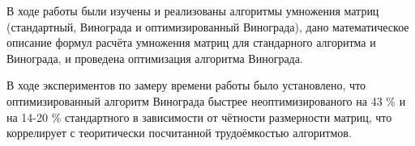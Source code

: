 \Conclusion
    В ходе работы были изучены и реализованы алгоритмы умножения матриц
    (стандартный, Винограда и оптимизированный Винограда), 
    дано математическое описание формул расчёта умножения матриц для стандарного алгоритма и Винограда,
    и проведена оптимизация алгоритма Винограда.
    
    В ходе экспериментов по замеру времени работы было установлено, что 
    оптимизированный алгоритм Винограда быстрее неоптимизированого на 43 \% и
    на 14-20 \% стандартного в зависимости от чётности размерности матриц, что
    коррелирует с теоритически посчитанной трудоёмкостью алгоритмов. 
